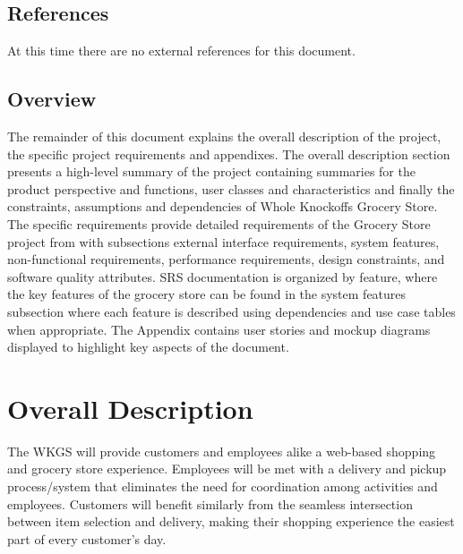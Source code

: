 \documentclass{scrreprt}
\theoremstyle{funreq}
\begin{document}
\section{References}
At this time there are no external references for this document.

\section{Overview}
The remainder of this document explains the overall description of the project, the specific project requirements and appendixes. The overall description section presents a high-level summary of the project containing summaries for the product perspective and functions, user classes and characteristics and finally the constraints, assumptions and dependencies of Whole Knockoffs Grocery Store. The specific requirements provide detailed requirements of the Grocery Store project from with subsections external interface requirements, system features, non-functional requirements, performance requirements, design constraints, and software quality attributes. SRS documentation is organized by feature, where the key features of the grocery store can be found in the system features subsection where each feature is described using dependencies and use case tables when appropriate. The Appendix contains user stories and mockup diagrams displayed to highlight key aspects of the document.

{\let\clearpage\relax 
\chapter{Overall Description}}

The WKGS will provide customers and employees alike a web-based shopping and grocery store experience. Employees will be met with a delivery and pickup process/system that eliminates the need for coordination among activities and employees. Customers will benefit similarly from the seamless intersection between item selection and delivery, making their shopping experience the easiest part of every customer's day. 

\end{document}
